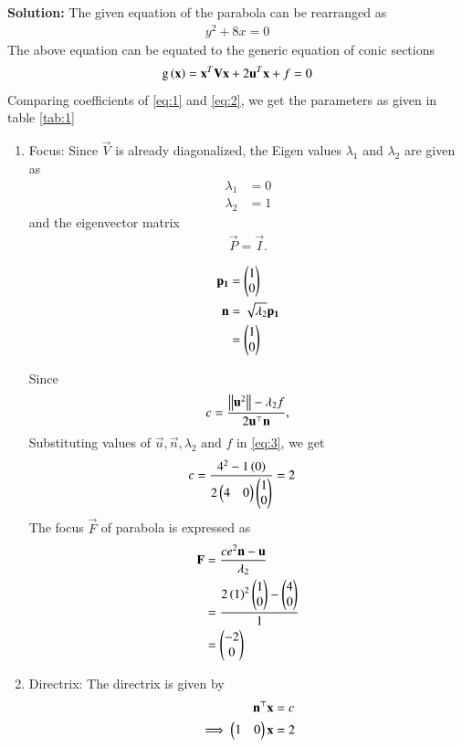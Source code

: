 \documentclass[journal,12pt,twocolumn]{IEEEtran}
\begin{document}
\begin{enumerate}
\textbf{Solution:}
The given equation of the parabola can be rearranged as
\begin{align}
y^2+8x = 0
\label{eq:1}
\end{align}
The above equation can be equated to the generic equation of conic sections
\begin{align}
\text{g}\left(\mathbf{x}\right) = \mathbf{x}^T\mathbf{V}\mathbf{x} + 2\mathbf{u}^T\mathbf{x} + f = 0
\label{eq:2} 
\end{align}
Comparing coefficients of \eqref{eq:1} and \eqref{eq:2}, we get the parameters as given in table \ref{tab:1}
\begin{table}[h]
\centering

\caption{}
\label{tab:1}
\end{table}
\begin{enumerate}
\item Focus: Since $\vec{V}$ is already diagonalized, the Eigen values $\lambda_1$ and $\lambda_2$ are given as 
\begin{align}
\lambda_1 &= 0 \\
\lambda_2 &= 1 
\end{align}
and the eigenvector matrix
\begin{align}
\vec{P} = \vec{I}.
\end{align}

\begin{align}
\mathbf{p_1} &= \begin{pmatrix}1 \\ 0\end{pmatrix} \\
\mathbf{n} &= \sqrt{\lambda_2}\mathbf{p_1} \\
&= \begin{pmatrix}1 \\ 0\end{pmatrix} 
\end{align}

Since
\begin{align}
\label{eq:3}
c = \frac{\left\lVert\mathbf{u}^2\right\rVert-\lambda_2f}{2\mathbf{u}^\top\mathbf{n}},
\end{align}
Substituting values of $\vec{u}, \vec{n}, \lambda_2 \text{ and } f$ in \eqref{eq:3}, we get
\begin{align}
c &= \frac{4^2-1\left(0\right)}{2 \begin{pmatrix}4 & 0\end{pmatrix}\begin{pmatrix}1 \\ 0\end{pmatrix}} = 2
\end{align}
The focus $\vec{F}$ of parabola is expressed as
\begin{align}
\mathbf{F} &= \frac{ce^2\mathbf{n}-\mathbf{u}}{\lambda_2} \\
&= \frac{2\left(1\right)^2\begin{pmatrix}1 \\0\end{pmatrix} - \begin{pmatrix}4 \\ 0\end{pmatrix}}{1} \\
&= \begin{pmatrix}-2 \\ 0\end{pmatrix}
\end{align}
\item Directrix: The directrix is given by
\begin{align}
\mathbf{n}^\top\mathbf{x} &= c \\
\implies	\begin{pmatrix}1 & 0\end{pmatrix}\mathbf{x} &= 2
\end{align}


\end{enumerate}
\end{enumerate}
\end{document}
